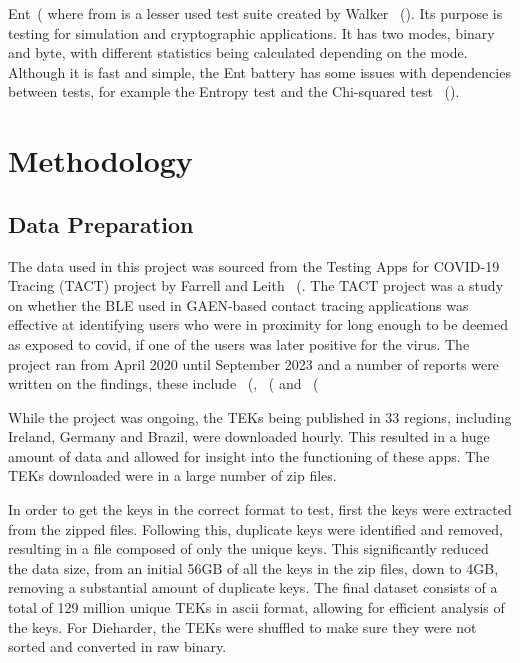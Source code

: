 Ent~(\cite{ent} where from is a lesser used test suite created by Walker ~(\cite{10.1145/3447773}). Its purpose is testing for simulation and cryptographic applications. It has two modes, binary and byte, with different statistics being calculated depending on the mode. Although it is fast and simple, the Ent battery has some issues with dependencies between tests, for example the Entropy test and the Chi-squared test ~(\cite{10.1145/3447773}). 


\section{Methodology}

\subsection{Data Preparation}

The data used in this project was sourced from the Testing Apps for COVID-19 Tracing (TACT) project by Farrell and Leith ~(\cite{TACT2023}. The TACT project was a study on whether the BLE used in GAEN-based contact tracing applications was effective at identifying users who were in proximity for long enough to be deemed as exposed to covid, if one of the users was later positive for the virus. The project ran from April 2020 until September 2023 and a number of reports were written on the findings, these include ~(\cite{LeithFarrell2020}, ~(\cite{LeithFarrell2020b} and ~(\cite{9488728} \newline

While the project was ongoing, the TEKs being published in 33 regions, including Ireland, Germany and Brazil, were downloaded hourly. This resulted in a huge amount of data and allowed for insight into the functioning of these apps. The TEKs downloaded were in a large number of zip files. \newline

In order to get the keys in the correct format to test, first the keys were extracted from the zipped files. Following this, duplicate keys were identified and removed, resulting in a file composed  of only the unique keys. This significantly reduced the data size, from an initial 56GB of all the keys in the zip files, down to 4GB, removing a substantial amount of duplicate keys. The final dataset consists of a total of 129 million unique TEKs in ascii format, allowing for efficient analysis of the keys. For Dieharder, the TEKs were shuffled to make sure they were not sorted and converted in raw binary.

